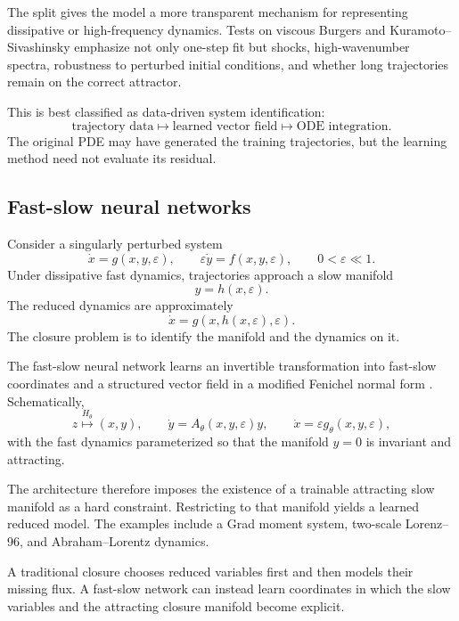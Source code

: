 \documentclass[11pt]{article}
\begin{document}
The split gives the model a more transparent mechanism for representing dissipative or high-frequency dynamics. Tests on viscous Burgers and Kuramoto--Sivashinsky emphasize not only one-step fit but shocks, high-wavenumber spectra, robustness to perturbed initial conditions, and whether long trajectories remain on the correct attractor.

This is best classified as data-driven system identification:
\[
\boxed{
\text{trajectory data}
\longmapsto
\text{learned vector field}
\longmapsto
\text{ODE integration}.
}
\]
The original PDE may have generated the training trajectories, but the learning method need not evaluate its residual.

\subsection{Fast-slow neural networks}

Consider a singularly perturbed system
\begin{equation}
 \dot x=g(x,y,\varepsilon),
 \qquad
 \varepsilon\dot y=f(x,y,\varepsilon),
 \qquad 0<\varepsilon\ll1.
\end{equation}
Under dissipative fast dynamics, trajectories approach a slow manifold
\[
 y=h(x,\varepsilon).
\]
The reduced dynamics are approximately
\[
 \dot x=g(x,h(x,\varepsilon),\varepsilon).
\]
The closure problem is to identify the manifold and the dynamics on it.

The fast-slow neural network learns an invertible transformation into fast-slow coordinates and a structured vector field in a modified Fenichel normal form \citep{serino2025fastslow}. Schematically,
\begin{equation}
 z\stackrel{H_\theta}{\longmapsto}(x,y),
 \qquad
 \dot y=A_\theta(x,y,\varepsilon)y,
 \qquad
 \dot x=\varepsilon g_\theta(x,y,\varepsilon),
\end{equation}
with the fast dynamics parameterized so that the manifold \(y=0\) is invariant and attracting.

The architecture therefore imposes the existence of a trainable attracting slow manifold as a hard constraint. Restricting to that manifold yields a learned reduced model. The examples include a Grad moment system, two-scale Lorenz--96, and Abraham--Lorentz dynamics.

\begin{bigidea}
A traditional closure chooses reduced variables first and then models their missing flux. A fast-slow network can instead learn coordinates in which the slow variables and the attracting closure manifold become explicit.
\end{bigidea}
\end{document}
